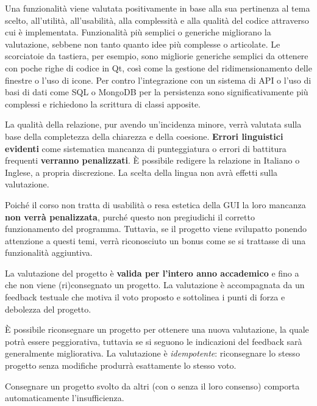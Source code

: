 \documentclass[10pt,a4paper,oneside]{article}
\begin{document}
Una funzionalità viene valutata positivamente in base alla sua pertinenza al tema scelto, all'utilità, all'usabilità, alla complessità e alla qualità del codice attraverso cui è implementata. Funzionalità più semplici o generiche migliorano la valutazione, sebbene non tanto quanto idee più complesse o articolate. Le scorciatoie da tastiera, per esempio, sono migliorie generiche semplici da ottenere con poche righe di codice in Qt, così come la gestione del ridimensionamento delle finestre o l'uso di icone. Per contro l'integrazione con un sistema di API o l'uso di basi di dati come SQL o MongoDB per la persistenza sono significativamente più complessi e richiedono la scrittura di classi apposite.

La qualità della relazione, pur avendo un'incidenza minore, verrà valutata sulla base della completezza della chiarezza e della coesione. \textbf{Errori linguistici evidenti} come sistematica mancanza di punteggiatura o errori di battitura frequenti \textbf{verranno penalizzati}. È possibile redigere la relazione in Italiano o Inglese, a propria discrezione. La scelta della lingua non avrà effetti sulla valutazione.

Poiché il corso non tratta di usabilità o resa estetica della GUI la loro mancanza \textbf{non verrà penalizzata}, purché questo non pregiudichi il corretto funzionamento del programma. Tuttavia, se il progetto viene svilupatto ponendo attenzione a questi temi, verrà riconosciuto un bonus come se si trattasse di una funzionalità aggiuntiva.

La valutazione del progetto è \textbf{valida per l'intero anno accademico} e fino a che non viene (ri)consegnato un progetto. La valutazione è accompagnata da un feedback testuale che motiva il voto proposto e sottolinea i punti di forza e debolezza del progetto.

È possibile riconsegnare un progetto per ottenere una nuova valutazione, la quale potrà essere peggiorativa, tuttavia se si seguono le indicazioni del feedback sarà generalmente migliorativa. La valutazione è \emph{idempotente}: riconsegnare lo stesso progetto senza modifiche produrrà esattamente lo stesso voto.

Consegnare un progetto svolto da altri (con o senza il loro consenso) comporta automaticamente l'insufficienza.
\end{document}
